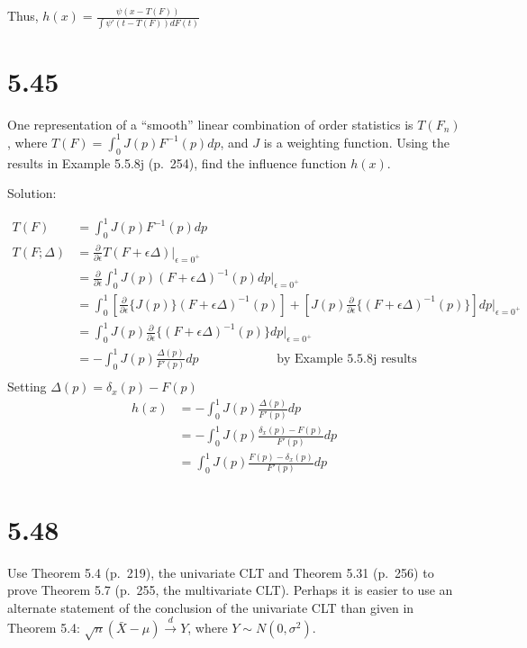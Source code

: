 \documentclass[
  letterpaper,
  DIV=11,
  numbers=noendperiod]{scrreprt}
\begin{document}
Thus, \(h(x) = \frac{\psi (x- T(F))}{\int \psi' (t- T(F))dF(t)}\)

\newpage

\hypertarget{section-38}{%
\section{5.45}\label{section-38}}

One representation of a ``smooth'' linear combination of order
statistics is \(T(F_n)\), where \(T(F)= \int_0^1 J(p) F^{-1} (p)dp\),
and \(J\) is a weighting function. Using the results in Example 5.5.8j
(p.~254), find the influence function \(h(x)\).

Solution:

\[
\begin{aligned}
T(F)&= \int_0^1 J(p) F^{-1} (p)dp \\
T(F;\Delta)  &= \frac{\partial}{\partial \epsilon} T(F+\epsilon \Delta) \bigg|_{\epsilon=0^+} \\
&= \frac{\partial}{\partial \epsilon} \int_0^1 J(p) (F+\epsilon \Delta)^{-1} (p)dp \bigg|_{\epsilon=0^+} \\
&=\int_0^1 \left[\frac{\partial}{\partial \epsilon} \{J(p)\} (F+\epsilon \Delta)^{-1} (p)\right] +\left[ J(p) \frac{\partial}{\partial \epsilon}\{(F+\epsilon \Delta)^{-1} (p)\}\right]dp \bigg|_{\epsilon=0^+} \\
&=\int_0^1  J(p) \frac{\partial}{\partial \epsilon}\{(F+\epsilon \Delta)^{-1} (p)\}dp \bigg|_{\epsilon=0^+} \\
&=-\int_0^1  J(p) \frac{\Delta (p)}{F'(p)} dp ~~~~~~~~~~~~~~~~~~~~~~~~~~~~ \text{by Example 5.5.8j results}\\ 
\end{aligned}
\] Setting \(\Delta(p) = \delta_{x}(p) - F(p)\) \[
\begin{aligned}
h(x) &= -\int_0^1  J(p) \frac{\Delta (p)}{F'(p)} dp \\
&= -\int_0^1  J(p) \frac{\delta_{x}(p) - F(p)}{F'(p)} dp \\
&= \int_0^1  J(p) \frac{F(p)-\delta_{x}(p)}{F'(p)} dp
\end{aligned}
\]

\newpage

\hypertarget{section-39}{%
\section{5.48}\label{section-39}}

Use Theorem 5.4 (p.~219), the univariate CLT and Theorem 5.31 (p.~256)
to prove Theorem 5.7 (p.~255, the multivariate CLT). Perhaps it is
easier to use an alternate statement of the conclusion of the univariate
CLT than given in Theorem 5.4:
\(\sqrt n (\bar X - \mu) \overset d \to Y\), where
\(Y \sim N(0,\sigma^2)\).
\end{document}
